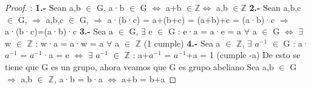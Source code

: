 \documentclass[10pt,a4paper,oneside]{article}
\begin{document}
				\begin{proof}:
					\newline
					\newline
					\textbf{1.-} Sean a,b $\in$ G, a·b $\in$ G $\iff$ a+b $\in \mathbb{Z} \iff$ a,b $\in \mathbb{Z}$
					\newline
					\newline
					\textbf{2.-} Sean a,b,c $\in$ G, $\Rightarrow$ a,b,c $\in$ G, $\Rightarrow$ a·(b·c) = a+(b+c) = (a+b)+c = (a·b)·c  $\Rightarrow$ a·(b·c)=(a·b)·c
					\newline
					\newline
					\textbf{3.-} Sea a $\in$ G, $\exists$ e $\in$ G : e·a = a·e = a $\forall$ a $\in$ G $\iff$  $\exists$ w $\in$ $\mathbb{Z}$ : w·a = a·w = a $\forall$ a $\in$ $\mathbb{Z}$ (1 cumple)
					\newline
					\newline
					\textbf{4.-} Sea a $\in$ $\mathbb{Z}$, $\exists$ $a^{-1}$ $\in$ G : a·$a^{-1}$ = $a^{-1}$·a = e $\iff$ $\exists$ $a^{-1}$ $\in$ $\mathbb{Z}$ : a+$a^{-1}$ = $a^{-1}$+a = 1 (cumple -a)
					\newline
					\newline
					De esto se tiene que G es un grupo, ahora veamos que G es grupo abeliano
					\newline
					\newline
					Sea a,b $\in$ G $\Rightarrow$ a,b $\in$ $\mathbb{Z}$, a·b = b·a $\iff$ a+b = b+a 
				\end{proof}
\end{document}
